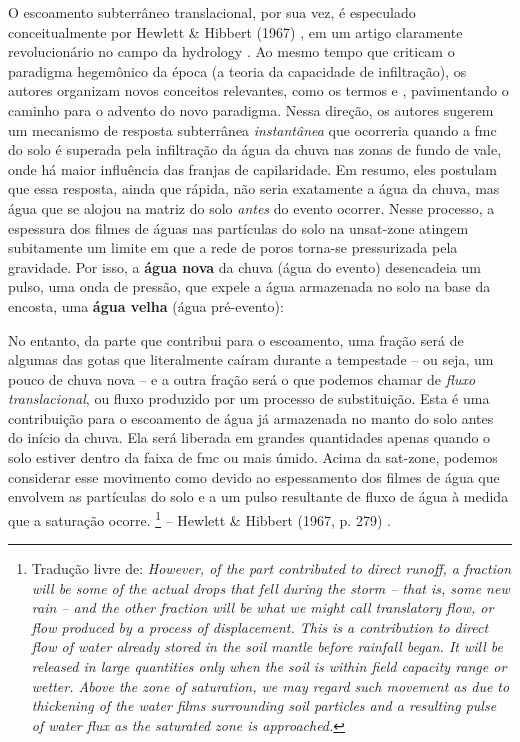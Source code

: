 \documentclass[./main.tex]{subfiles}
\begin{document}
\par O escoamento subterrâneo translacional, por sua vez, é especulado conceitualmente por Hewlett \& Hibbert (1967) \cite{Hewlett1967}, em um artigo claramente revolucionário no campo da \gls{hydrology} \cite{McDonnell2009}. Ao mesmo tempo que criticam o \gls{paradigma} hegemônico da época (a \gls{teoria} da capacidade de infiltração), os autores organizam novos conceitos relevantes, como os termos  e , pavimentando o caminho para o advento do novo \gls{paradigma}. Nessa direção, os autores sugerem um mecanismo de resposta subterrânea \textit{instantânea} que ocorreria quando a \gls{fmc} do solo é superada pela infiltração da água da chuva nas zonas de fundo de vale, onde há maior influência das franjas de capilaridade. Em resumo, eles postulam que essa resposta, ainda que rápida, não seria exatamente a água da chuva, mas água que se alojou na matriz do solo \textit{antes} do evento ocorrer. Nesse processo, a espessura dos filmes de águas nas partículas do solo na \gls{unsat-zone} atingem subitamente um limite em que a rede de poros torna-se pressurizada pela gravidade. Por isso, a \textbf{água nova} da chuva (água do evento) desencadeia um pulso, uma onda de pressão, que expele a água armazenada no solo na base da encosta, uma \textbf{água velha} (água pré-evento):

\begin{adjustwidth}{100pt}{0pt}
\medskip
\small
No entanto, da parte que contribui para o escoamento, uma fração será de algumas das gotas que literalmente caíram durante a tempestade -- ou seja, um pouco de chuva nova -- e a outra fração será o que podemos chamar de \textit{fluxo translacional}, ou fluxo produzido por um processo de substituição. Esta é uma contribuição para o escoamento de água já armazenada no manto do solo antes do início da chuva. Ela será liberada em grandes quantidades apenas quando o solo estiver dentro da faixa de \gls{fmc} ou mais úmido. Acima da \gls{sat-zone}, podemos considerar esse movimento como devido ao espessamento dos filmes de água que envolvem as partículas do solo e a um pulso resultante de fluxo de água à medida que a saturação ocorre.
\footnote{Tradução livre de: 
\textit{
However, of the part contributed to direct runoff, a fraction will be some of the actual drops that fell during the storm -- that is, some new rain -- and the other fraction will be what we might call translatory flow, or flow produced by a process of displacement. This is a contribution to direct flow of water already stored in the soil mantle before rainfall began. It will be released in large quantities only when the soil is within field capacity range or wetter. Above the zone of saturation, we may regard such movement as due to thickening of the water films surrounding soil particles and a resulting pulse of water flux as the saturated zone is approached.
}} -- Hewlett \& Hibbert (1967, p. 279) \cite{Hewlett1967}.
\medskip
\end{adjustwidth}
\end{document}
